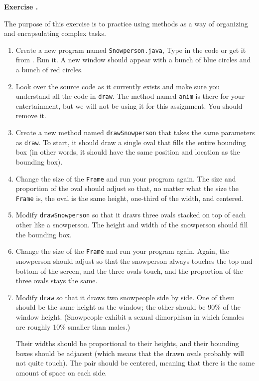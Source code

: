 \documentclass{book}
\newcounter{exercisenum}
\renewcommand{\theexercisenum}{{\thechapter}.\arabic{exercisenum}}
\newenvironment{exercisesize}{\begin{small}}{\end{small}}
\newcommand{\exerciseheader}[2]{                                          
     
  \begin{exercisesize}                                                    
     
     
  \def\theenumi{\alph{enumi}}                                             
  \def\labelenumi{\theenumi.}                                             
  \def\theenumii{\roman{enumii}}                                          
  \def\labelenumii{\theenumii.}                                           
  {\bf Exercise {#1}{#2}}\hspace{0.1in}                 
}
\newcommand{\startexercise}[1]{%
  \refstepcounter{exercisenum}                                            
  \exerciseheader{\theexercisenum}{#1}                                    
}
\newcommand{\stopexercise}{%
  {\hfill}                                                               
  \end{exercisesize}      
}
\newcommand{\normaldif}{}
\newenvironment{exercise}{\startexercise{\normaldif{}}}{\stopexercise}
\begin{document}
\begin{exercise}

The purpose of this exercise is to practice using methods
as a way of organizing and encapsulating complex tasks.

\begin{enumerate}

\item Create a new program named {\tt Snowperson.java},
Type in the code or get it from \url{}.
Run it. A new window should appear with a bunch of blue circles and
a bunch of red circles.

\item Look over the source code as it currently exists and make
sure you understand all the code in {\tt draw}.  The method
named {\tt anim} is there for your entertainment, but we will
not be using it for this assignment.  You should remove it.

\item Create a new method named {\tt drawSnowperson} that takes the
same parameters as {\tt draw}.  To start, it should draw a single
oval that fills the entire bounding box (in other words, it should
have the same position and location as the bounding box).

\item Change the size of the {\tt Frame} and run your program again.
The size and proportion of the oval should adjust so that, no matter
what the size the {\tt Frame} is, the oval is the same height,
one-third of the width, and centered.

\item Modify {\tt drawSnowperson} so that it draws three ovals
stacked on top of each other like a snowperson.  The height and width
of the snowperson should fill the bounding box.

\item Change the size of the {\tt Frame} and run your program again.
Again, the snowperson should adjust so that the snowperson always
touches the top and bottom of the screen, and the three ovals touch,
and the proportion of the three ovals stays the same.

\item Modify {\tt draw} so that it draws two snowpeople side by
side.  One of them should be the same height as the window; the other
should be 90\% of the window height.  (Snowpeople exhibit a sexual
dimorphism in which females are roughly 10\% smaller than males.)

Their widths should be proportional to their heights, and their
bounding boxes should be adjacent (which means that the drawn ovals
probably will not quite touch).  The pair should be centered, meaning
that there is the same amount of space on each side.


\end{enumerate}
\end{exercise}
\end{document}
